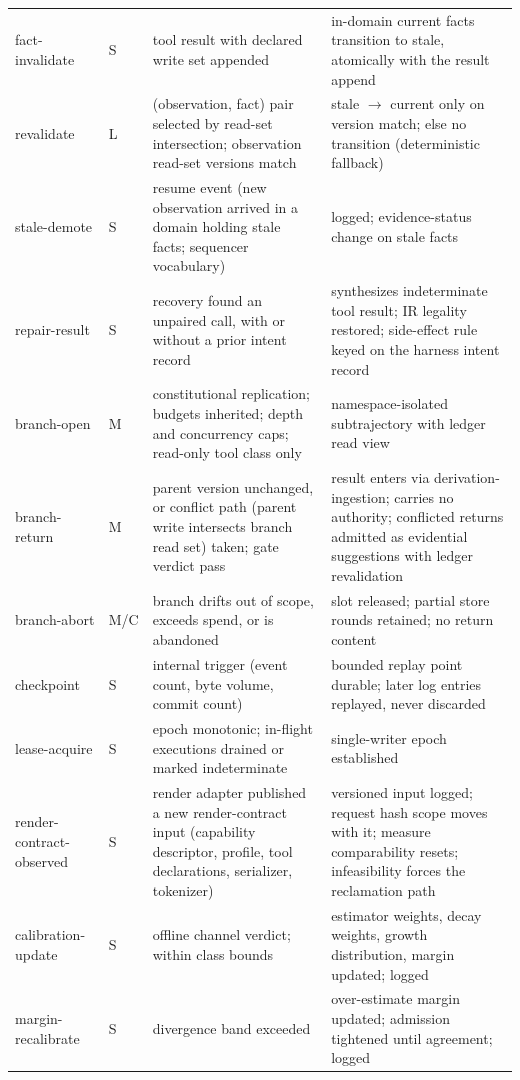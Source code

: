 \documentclass[11pt]{article}
\begin{document}
{\begin{longtable}{@{}p{2.35cm}p{1.15cm}p{4.6cm}p{5.6cm}@{}}
fact-invalidate & S & tool result with declared write set appended & in-domain current facts transition to stale, atomically with the result append \\
revalidate & L & (observation, fact) pair selected by read-set intersection; observation read-set versions match & stale $\to$ current only on version match; else no transition (deterministic fallback) \\
stale-demote & S & resume event (new observation arrived in a domain holding stale facts; sequencer vocabulary) & logged; evidence-status change on stale facts \\
repair-result & S & recovery found an unpaired call, with or without a prior intent record & synthesizes indeterminate tool result; IR legality restored; side-effect rule keyed on the harness intent record \\
branch-open & M & constitutional replication; budgets inherited; depth and concurrency caps; read-only tool class only & namespace-isolated subtrajectory with ledger read view \\
branch-return & M & parent version unchanged, or conflict path (parent write intersects branch read set) taken; gate verdict pass & result enters via derivation-ingestion; carries no authority; conflicted returns admitted as evidential suggestions with ledger revalidation \\
branch-abort & M/C & branch drifts out of scope, exceeds spend, or is abandoned & slot released; partial store rounds retained; no return content \\
checkpoint & S & internal trigger (event count, byte volume, commit count) & bounded replay point durable; later log entries replayed, never discarded \\
lease-acquire & S & epoch monotonic; in-flight executions drained or marked indeterminate & single-writer epoch established \\
render-contract-observed & S & render adapter published a new render-contract input (capability descriptor, profile, tool declarations, serializer, tokenizer) & versioned input logged; request hash scope moves with it; measure comparability resets; infeasibility forces the reclamation path \\
calibration-update & S & offline channel verdict; within class bounds & estimator weights, decay weights, growth distribution, margin updated; logged \\
margin-recalibrate & S & divergence band exceeded & over-estimate margin updated; admission tightened until agreement; logged \\

\end{longtable}}
\end{document}
